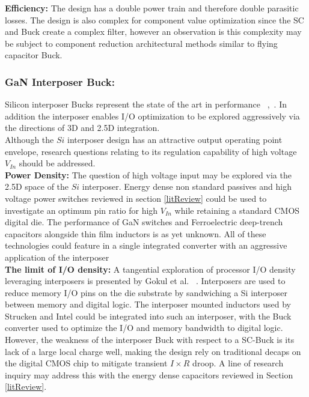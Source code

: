 \documentclass[letterpaper,twocolumn,10pt]{article}
\begin{document}
\textbf{Efficiency: }The design has a double power train and therefore double parasitic losses. The design is also complex for component value optimization since the SC and Buck create a complex filter, however an observation is this complexity may be subject to component reduction architectural methods similar to flying capacitor Buck.\\  
\subsubsection{GaN Interposer Buck: }Silicon interposer Bucks represent the state of the art in performance ~\cite{Intel2010},~\cite{Sturcken2013}. In addition the interposer enables I/O optimization to be explored aggressively via the directions of 3D and 2.5D integration.\\
Although the $Si$ interposer design has an attractive output operating point envelope, research questions relating to its regulation capability of high voltage $V_{In}$ should be addressed.\\

\textbf{Power Density: }The question of high voltage input may be explored via the 2.5D space of the $Si$ interposer. Energy dense non standard passives and high voltage power switches reviewed in section \ref{litReview} could be used to investigate an optimum pin ratio for high $V_{In}$ while retaining a standard CMOS digital die. The performance of GaN switches and Ferroelectric deep-trench capacitors alongside thin film inductors is as yet unknown. All of these technologies could feature in a single integrated converter with an aggressive application of the interposer\\ 

\textbf{The limit of I/O density: }A tangential exploration of processor I/O density leveraging interposers is presented by Gokul et al. ~\cite{Gokul2011}. Interposers are used to reduce memory I/O pins on the die substrate by sandwiching a Si interposer between memory and digital logic. The interposer mounted inductors used by Strucken and Intel could be integrated into such an interposer, with the Buck converter used to optimize the I/O and memory bandwidth to digital logic.\\
However, the weakness of the interposer Buck with respect to a SC-Buck is its lack of a large local charge well, making the design rely on traditional decaps on the digital CMOS chip to mitigate transient $I \times R$ droop. A line of research inquiry may address this with the energy dense capacitors reviewed in Section \ref{litReview}.\\ 
\end{document}
